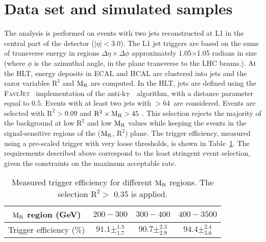 {{\section{Data set and simulated samples}
\label{sec:sample}
The analysis is performed on events with two jets reconstructed at L1 
in the central part of the detector ($|\eta|< 3.0$). The L1 jet
triggers are based on the sums of %
transverse energy in regions $\Delta\eta\times\Delta\phi$
approximately 1.05$\times$1.05 radians in
size~\cite{Chatrchyan:2008zzk} (where $\phi$ is the azimuthal angle, in the plane transverse to the LHC beams.). 
At the HLT, energy deposits in ECAL and HCAL are clustered into jets and the
razor variables $\mathrm{R^2}$ and $\mathrm{M_{\rm R}}$ are computed. In the
HLT, jets are defined using the {\scshape FastJet}~\cite{fastjet}
implementation of the anti-k$_{\rm{T}}$~\cite{antikt} algorithm, with
a distance parameter equal to $0.5$. Events with at least two jets with \pt$>64$~\GeV are
considered. Events are selected with $\mathrm{R^2}> 0.09$ and
$\mathrm{R^2} \times \mathrm{M_{\rm R}} > 45$ \GeV. This selection rejects
the majority of the background at low $\mathrm{R^2}$ and low
$\mathrm{M_{\rm R}}$ values while keeping the events in the signal-sensitive
regions of the ($\mathrm{M_{\rm R}}$, $\mathrm{R}^2$) plane. 
The trigger efficiency, measured using a pre-scaled trigger with very loose thresholds, is
shown in Table~\ref{tab:Trigger}.  The requirements described above correspond to the least stringent event selection, given the constraints on the maximum acceptable rate.

\begin{table}[htb]
\begin{center}
  \caption{\label{tab:Trigger}Measured trigger efficiency for different
    $\mathrm{M_{\rm R}}$ regions. The selection $\mathrm{R^2} >$ 0.35 is applied.}
\begin{tabular}{|c|c|c|c|} 
  \hline
  $\mathrm{M_{\rm R}}$ region (GeV) & $200-300$ &  $300-400$ &  $400-3500$ \\
  \hline
  Trigger efficiency (\%) & $91.1\pm ^{1.5}_{1.7}$ & $90.7\pm ^{2.3}_{2.9}$ & $94.4 \pm ^{2.4}_{3.6}$ \\
  \hline
\end{tabular}
\end{center}
\end{table}

}}
